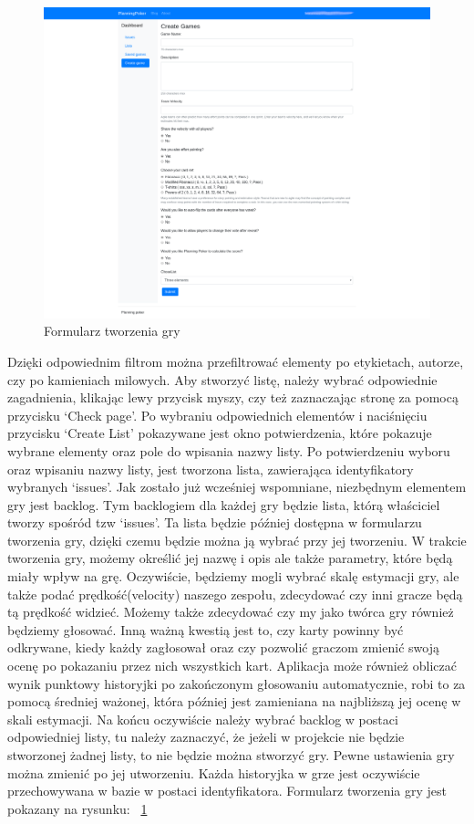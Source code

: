 \begin{figure}
	\centering\includegraphics[width=.7\textwidth]{img/Formularz}
	\caption{Formularz tworzenia gry}\label{rys:form}%
\end{figure}
Dzięki odpowiednim filtrom można przefiltrować elementy po etykietach, autorze, czy po kamieniach milowych.
Aby stworzyć listę, należy wybrać odpowiednie zagadnienia,
klikając lewy przycisk myszy, czy też zaznaczając stronę za pomocą przycisku `Check page'.
Po wybraniu odpowiednich elementów i naciśnięciu przycisku `Create List' pokazywane jest okno potwierdzenia,
które pokazuje wybrane elementy oraz pole do wpisania nazwy listy.
Po potwierdzeniu wyboru oraz wpisaniu nazwy listy, jest tworzona lista, zawierająca identyfikatory wybranych `issues'.
Jak zostało już wcześniej wspomniane, niezbędnym elementem gry jest backlog.
Tym backlogiem dla każdej gry będzie lista, którą właściciel tworzy spośród tzw `issues'.
Ta lista będzie później dostępna w formularzu tworzenia gry,
dzięki czemu będzie można ją wybrać przy jej tworzeniu.
W trakcie tworzenia gry, możemy określić jej nazwę i opis ale także parametry, które będą miały wpływ na grę.
Oczywiście, będziemy mogli wybrać skalę estymacji gry, ale także podać prędkość(velocity) naszego zespołu,
zdecydować czy inni gracze będą tą prędkość widzieć.
Możemy także zdecydować czy my jako twórca gry również będziemy głosować.
Inną ważną kwestią jest to, czy karty powinny być odkrywane, kiedy każdy zagłosował
oraz czy pozwolić graczom zmienić swoją ocenę po pokazaniu przez nich wszystkich kart.
Aplikacja może również obliczać wynik punktowy historyjki po zakończonym głosowaniu automatycznie,
robi to za pomocą średniej ważonej, która później jest zamieniana na najbliższą jej ocenę w skali estymacji.
Na końcu oczywiście należy wybrać backlog w postaci odpowiedniej listy, tu należy zaznaczyć,
że jeżeli w projekcie nie będzie stworzonej żadnej listy, to nie będzie można stworzyć gry.
Pewne ustawienia gry można zmienić po jej utworzeniu.
Każda historyjka w grze jest oczywiście przechowywana w bazie w postaci identyfikatora.
Formularz tworzenia gry jest pokazany na rysunku: 
~\ref{rys:form} 

